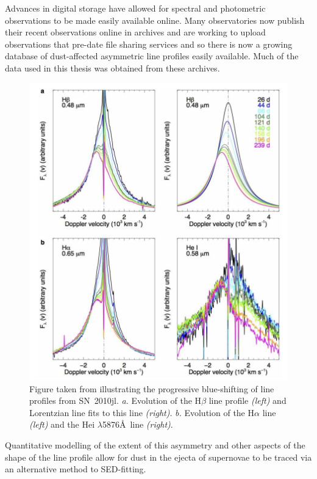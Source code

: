 Advances in digital storage have allowed for spectral and photometric observations to be made easily available online.  Many observatories now publish their recent observations online in archives and are working to upload observations that pre-date file sharing services and so there is now a growing database of dust-affected asymmetric line profiles easily available. Much of the data used in this thesis was obtained from these archives.
\begin{figure}[!t]
\centering
\includegraphics[clip=true,scale=0.4,trim= 0 -20 0 -20]{chapters/chapter1/figs/2010jl.png}
\caption{Figure taken from \citet{Gall2014} illustrating the progressive blue-shifting of line profiles from SN~2010jl.  {\em a.} Evolution of the H$\beta$ line profile {\em (left)} and Lorentzian line fits to this line {\em (right)}. {\em b.} Evolution of the H$\alpha$ line {\em (left)} and the He{\sc i} $\lambda$5876\AA\ line {\em (right)}.}
\label{fig:2010jl}
\end{figure}




Quantitative modelling of the extent of this asymmetry and other aspects of the shape of the line profile allow for dust in the ejecta of supernovae to be traced via an alternative method to SED-fitting.  








